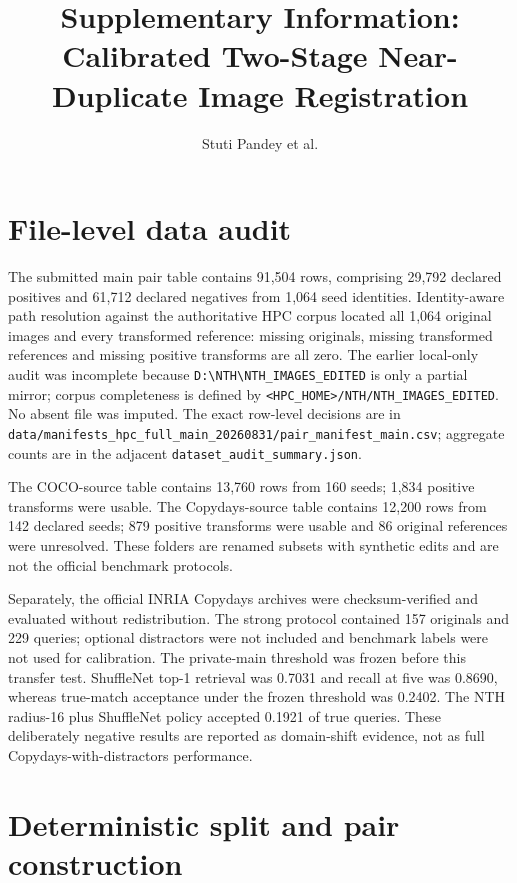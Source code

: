 \documentclass[11pt]{article}
\title{Supplementary Information: Calibrated Two-Stage Near-Duplicate Image Registration}
\author{Stuti Pandey et al.}
\date{}
\begin{document}
\maketitle

\section{File-level data audit}

The submitted main pair table contains 91,504 rows, comprising 29,792 declared positives and 61,712 declared negatives from 1,064 seed identities. Identity-aware path resolution against the authoritative HPC corpus located all 1,064 original images and every transformed reference: missing originals, missing transformed references and missing positive transforms are all zero. The earlier local-only audit was incomplete because \texttt{D:\textbackslash NTH\textbackslash NTH\_IMAGES\_EDITED} is only a partial mirror; corpus completeness is defined by \texttt{<HPC_HOME>/NTH/NTH\_IMAGES\_EDITED}. No absent file was imputed. The exact row-level decisions are in \texttt{data/manifests\_hpc\_full\_main\_20260831/pair\_manifest\_main.csv}; aggregate counts are in the adjacent \texttt{dataset\_audit\_summary.json}.

The COCO-source table contains 13,760 rows from 160 seeds; 1,834 positive transforms were usable. The Copydays-source table contains 12,200 rows from 142 declared seeds; 879 positive transforms were usable and 86 original references were unresolved. These folders are renamed subsets with synthetic edits and are not the official benchmark protocols.

Separately, the official INRIA Copydays archives were checksum-verified and evaluated without redistribution. The strong protocol contained 157 originals and 229 queries; optional distractors were not included and benchmark labels were not used for calibration. The private-main threshold was frozen before this transfer test. ShuffleNet top-1 retrieval was 0.7031 and recall at five was 0.8690, whereas true-match acceptance under the frozen threshold was 0.2402. The NTH radius-16 plus ShuffleNet policy accepted 0.1921 of true queries. These deliberately negative results are reported as domain-shift evidence, not as full Copydays-with-distractors performance.

\section{Deterministic split and pair construction}
\end{document}
